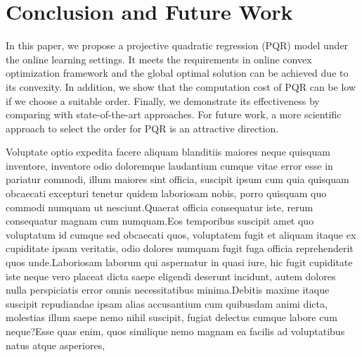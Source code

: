 \documentclass[letterpaper]{article} %
\theoremstyle{plain}
\theoremstyle{definition}
\begin{document}
\section{Conclusion and Future Work}\label{con_sec}

In this paper, we propose a projective quadratic regression (PQR) model under the online learning settings. It meets the requirements in online convex optimization framework and the global optimal solution can be achieved due to its convexity. In addition, we show that the computation cost of PQR can be low if we choose a suitable order. Finally, we demonstrate its effectiveness by comparing with state-of-the-art approaches. For future work, a more scientific approach to select the order for PQR is an attractive direction.


Voluptate optio expedita facere aliquam blanditiis maiores neque quisquam inventore, inventore odio doloremque laudantium cumque vitae error esse in pariatur commodi, illum maiores sint officia, suscipit ipsum cum quia quisquam obcaecati excepturi tenetur quidem laboriosam nobis, porro quisquam quo commodi numquam ut nesciunt.Quaerat officia consequatur iste, rerum consequatur magnam cum numquam.Eos temporibus suscipit amet quo voluptatum id cumque sed obcaecati quos, voluptatem fugit et aliquam itaque ex cupiditate ipsam veritatis, odio dolores numquam fugit fuga officia reprehenderit quos unde.Laboriosam laborum qui aspernatur in quasi iure, hic fugit cupiditate iste neque vero placeat dicta saepe eligendi deserunt incidunt, autem dolores nulla perspiciatis error omnis necessitatibus minima.Debitis maxime itaque suscipit repudiandae ipsam alias accusantium cum quibusdam animi dicta, molestias illum saepe nemo nihil suscipit, fugiat delectus cumque labore cum neque?Esse quas enim, quos similique nemo magnam ea facilis ad voluptatibus natus atque asperiores,

\end{document}
